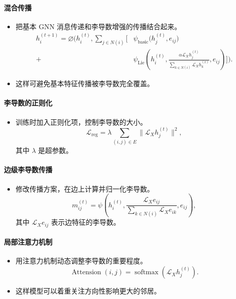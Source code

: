 \paragraph{混合传播}
\begin{itemize}
  \item 把基本 GNN 消息传递和李导数增强的传播结合起来。
  \[
    \begin{aligned}
      h_i^{(t+1)}=\varnothing\Biggl(h_i^{(t)},\sum_{j\in N(i)}\biggl[
       &\psi_{\mathrm{basic}}\bigl(h_j^{(t)},e_{ij}\bigr)\\
       {}+{}&\psi_{\mathrm{Lie}}\!\left(h_i^{(t)},
         \frac{\alpha\mathcal L_X h_j^{(t)}}{\displaystyle\sum_{k\in N(i)}\mathcal L_X h_k^{(t)}},
         e_{ij}\right)\biggr]\Biggr).
    \end{aligned}
  \]
  \item 这样可避免基本特征传播被李导数完全覆盖。
\end{itemize}

\paragraph{李导数的正则化}
\begin{itemize}
  \item 训练时加入正则化项，控制李导数的大小。
  \[
    \mathcal L_{\mathrm{reg}}=\lambda\sum_{(i,j)\in E}
           \lVert\mathcal L_X h_j^{(t)}\rVert^2,
  \]
  其中 $\lambda$ 是超参数。
\end{itemize}

\paragraph{边级李导数传播}
\begin{itemize}
  \item 修改传播方案，在边上计算并归一化李导数。
  \[
    m_{ij}^{(t)}=\psi\!\left(h_i^{(t)},
         \frac{\mathcal L_X e_{ij}}{\displaystyle\sum_{k\in N(i)}\mathcal L_X e_{ik}},
         e_{ij}\right),
  \]
  其中 $\mathcal L_X e_{ij}$ 表示边特征的李导数。
\end{itemize}

\paragraph{局部注意力机制}
\begin{itemize}
  \item 用注意力机制动态调整李导数的重要程度。
  \[
    \operatorname{Attension}(i,j)=\operatorname{softmax}(\mathcal L_X h_j^{(t)}).
  \]
  \item 这样模型可以着重关注方向性影响更大的邻居。
\end{itemize}

